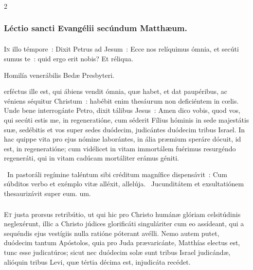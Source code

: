 \documentclass[9pt,twoside]{extarticle}
\begin{document}
\begin{multicols}{2}
{{\subsubsection*{\center Léctio sancti Evangélii secúndum Matthæum.}
\subsubsection*{\center {}}
\lettrine{I}n illo témpore~: Dixit Petrus ad Jesum~: Ecce nos relíquimus ómnia, et secúti sumus te~: quid ergo erit nobis? Et réliqua.

\begin{center}Homilía venerábilis Bedæ Presbyteri.\\
\end{center}
erféctus ille est, qui ábiens vendit ómnia, quæ habet, et dat paupéribus, ac véniens séquitur Christum~: habébit enim thesáurum non deficiéntem in cœlis. Unde bene interrogánte Petro, dixit tálibus Jesus~: Amen dico vobis, quod vos, qui secúti estis me, in regeneratióne, cum séderit Fílius hóminis in sede majestátis suæ, sedébitis et vos super sedes duódecim, judicántes duódecim tribus Israel. In hac quippe vita pro ejus nómine laborántes, in ália præmium speráre dócuit, id est, in regeneratióne; cum vidélicet in vitam immortálem fuérimus resurgéndo regeneráti, qui in vitam cadúcam mortáliter erámus géniti.

\begin{tightlist}{}
\item {}~In pastoráli regímine taléntum sibi créditum magnífice dispensávit~: \textred{*} Cum súbditos verbo et exémplo vitæ alléxit, allelúja. ~Jucunditátem et exsultatiónem thesaurizávit super eum. um.
\end{tightlist}

\subsubsection*{\center {}}
\lettrine{E}t justa prorsus retribútio, ut qui hic pro Christo humánæ glóriam celsitúdinis neglexérunt, illic a Christo júdices glorificáti singuláriter cum eo assídeant, qui a sequéndis ejus vestígiis nulla ratióne póterant avélli. Nemo autem putet, duódecim tantum Apóstolos, quia pro Juda prævaricánte, Matthías electus est, tunc esse judicatúros; sicut nec duódecim solæ sunt tribus Israel judicándæ, alióquin tribus Levi, quæ tértia décima est, injudicáta recédet.

}}
\end{multicols}
\end{document}
